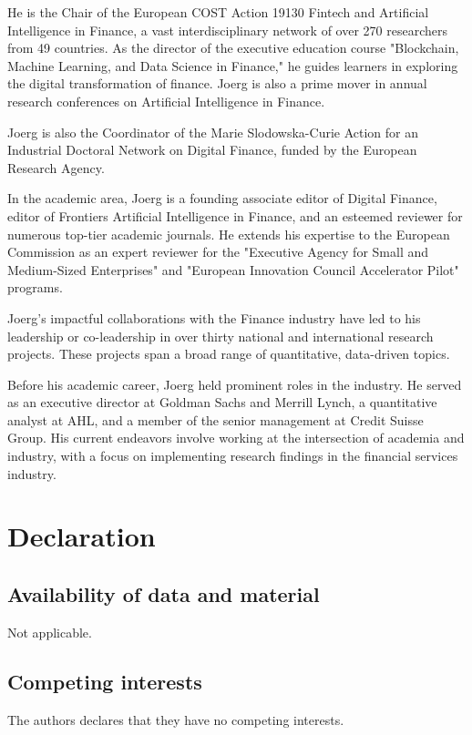 \documentclass{article}[a4paper]
\begin{document}
He is the Chair of the European COST Action 19130 Fintech and Artificial Intelligence in Finance, a vast interdisciplinary network of over 270 researchers from 49 countries. As the director of the executive education course "Blockchain, Machine Learning, and Data Science in Finance," he guides learners in exploring the digital transformation of finance. Joerg is also a prime mover in annual research conferences on Artificial Intelligence in Finance.

Joerg is also the Coordinator of the Marie Slodowska-Curie Action for an Industrial Doctoral Network on Digital Finance, funded by the European Research Agency.

In the academic area, Joerg is a founding associate editor of Digital Finance, editor of Frontiers Artificial Intelligence in Finance, and an esteemed reviewer for numerous top-tier academic journals. He extends his expertise to the European Commission as an expert reviewer for the "Executive Agency for Small and Medium-Sized Enterprises" and "European Innovation Council Accelerator Pilot" programs.

Joerg's impactful collaborations with the Finance industry have led to his leadership or co-leadership in over thirty national and international research projects. These projects span a broad range of quantitative, data-driven topics.

Before his academic career, Joerg held prominent roles in the industry. He served as an executive director at Goldman Sachs and Merrill Lynch, a quantitative analyst at AHL, and a member of the senior management at Credit Suisse Group. His current endeavors involve working at the intersection of academia and industry, with a focus on implementing research findings in the financial services industry.

\newpage
\section*{Declaration}

\subsection*{Availability of data and material}
Not applicable.

\subsection*{Competing interests}
The authors declares that they have no competing interests.
\end{document}
